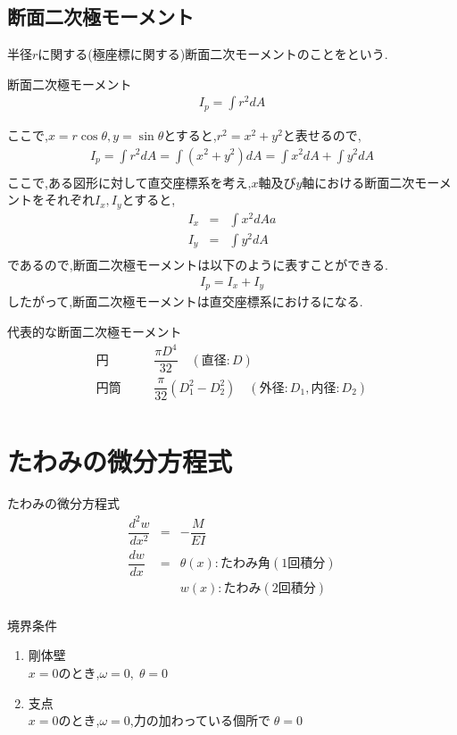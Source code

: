 \documentclass[a4paper]{jsarticle}
\begin{document}
\subsection{断面二次極モーメント}
半径$r$に関する(極座標に関する)断面二次モーメントのことをという.
\begin{itembox}[l]{断面二次極モーメント}
    \begin{eqnarray*}
        \displaystyle I_p=\int r^2dA
    \end{eqnarray*}
\end{itembox}
ここで,$x=r\cos\theta,y=\sin\theta$とすると,$r^2=x^2+y^2$と表せるので,
\begin{eqnarray*}
    \displaystyle I_p=\int r^2dA=\int \left(x^2+y^2\right)dA=\int x^2dA+\int y^2dA\\
\end{eqnarray*}
ここで,ある図形に対して直交座標系を考え,$x$軸及び$y$軸における断面二次モーメントをそれぞれ$I_x,I_y$とすると,
\begin{eqnarray*}
    \displaystyle
    I_x&=&\int x^2dAa\\
    I_y&=&\int y^2dA\\
\end{eqnarray*}
であるので,断面二次極モーメントは以下のように表すことができる.
\begin{eqnarray*}
    I_p=I_x+I_y
\end{eqnarray*}
したがって,断面二次極モーメントは直交座標系におけるになる.\\
\begin{itembox}[l]{代表的な断面二次極モーメント}
    \begin{eqnarray*}
        円\qquad&&\dfrac{\pi D^4}{32}\quad(直径:D)\\
        円筒\quad&&\dfrac{\pi}{32}\left(D_1^2-D_2^2\right)\quad(外径:D_1,内径:D_2)\\
    \end{eqnarray*}
\end{itembox}
\section{たわみの微分方程式}
\begin{itembox}[l]{たわみの微分方程式}
    \begin{eqnarray*}
        \dfrac{d^2w}{dx^2}&=&-\dfrac{M}{EI}\\
        \dfrac{dw}{dx}&=&\theta\left(x\right):たわみ角 (1回積分)\\
        &&w\left(x\right):たわみ(2回積分)\\
    \end{eqnarray*}
\end{itembox}
\begin{itembox}[l]{境界条件}
    \begin{enumerate}[(1)]
        \item 剛体壁\\
              $x=0$のとき,\quad$\omega=0,\;\theta=0$
        \item 支点\\
              $x=0$のとき,\quad$\omega=0$,力の加わっている個所で$\;\theta =0$
    \end{enumerate}
\end{itembox}
\end{document}
